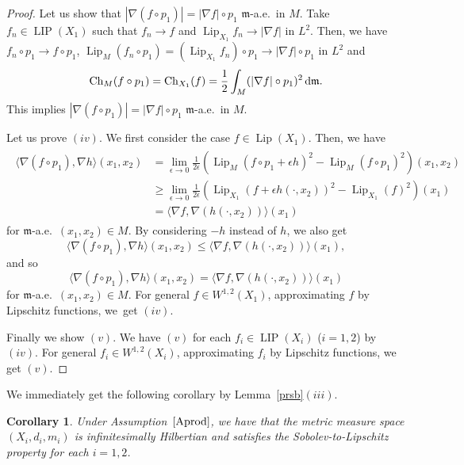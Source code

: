 \documentclass[pdftex]{sigma}
\numberwithin{equation}{section}
\newtheorem{Cor}[Thm]{Corollary}
\theoremstyle{definition}
\newcommand{\LIP}{\operatorname{LIP}}
\newcommand{\Lip}{\operatorname{Lip}}
\newcommand{\Ch}{\operatorname{Ch}}
\newcommand{\mf}{\mathfrak{m}}
\begin{document}
\begin{proof}
Let us show that $|\nabla (f\circ p_1)|=|\nabla f|\circ p_1$ $\mf$-a.e.\ in $M$.
Take $f_n\in \LIP(X_1)$ such that $f_n\to f$ and $\Lip_{X_1} f_n\to |\nabla f|$ in $L^2$.
Then, we have $f_n\circ p_1\to f\circ p_1$, $\Lip_M (f_n\circ p_1)=(\Lip_{X_1} f_n)\circ p_1 \to |\nabla f|\circ p_1$ in $L^2$ and
\[
\Ch_{M}(f\circ p_1)=\Ch_{X_1}(f)=\frac{1}{2}\int_{M}(|\nabla f|\circ p_1)^2\,{\rm d}\mf.
\]
This implies $|\nabla (f\circ p_1)|=|\nabla f|\circ p_1$ $\mf$-a.e.\ in $M$.

Let us prove $(iv)$.
We first consider the case $f\in \Lip(X_1)$.
Then, we have
\begin{gather*}
\begin{split}
\langle\nabla(f\circ p_1),\nabla h\rangle(x_1,x_2)
&=\lim_{\epsilon\to 0}\frac{1}{2\epsilon}\left(\Lip_M(f\circ p_1+\epsilon h)^2-\Lip_M(f\circ p_1)^2\right)(x_1,x_2)\\
&\geq \lim_{\epsilon\to 0}\frac{1}{2\epsilon}\left(\Lip_{X_1}(f+\epsilon h(\cdot,x_2))^2-\Lip_{X_1}(f)^2\right)(x_1)\\
&=\langle\nabla f,\nabla (h(\cdot,x_2))\rangle(x_1)
\end{split}
\end{gather*}
for $\mf$-a.e.\ $(x_1,x_2)\in M$.
By considering $-h$ instead of $h$, we also get \[\langle\nabla(f\circ p_1),\nabla h\rangle(x_1,x_2)\leq \langle\nabla f,\nabla (h(\cdot,x_2))\rangle(x_1),\] and so \[\langle\nabla(f\circ p_1),\nabla h\rangle(x_1,x_2)= \langle\nabla f,\nabla (h(\cdot,x_2))\rangle(x_1)\]
for $\mf$-a.e.\ $(x_1,x_2)\in M$.
For general $f\in W^{1,2}(X_1)$, approximating $f$ by Lipschitz functions, we~get $(iv)$.

Finally we show $(v)$.
We have $(v)$ for each $f_i\in\LIP(X_i)$ ($i=1,2$) by $(iv)$.
For general $f_i\in W^{1,2}(X_i)$, approximating $f_i$ by Lipschitz functions, we get $(v)$.
\end{proof}

We immediately get the following corollary by Lemma~\ref{prsb}$(iii)$.
\begin{Cor}\label{ihsl}
Under Assumption~$\ref{Aprod}$, we have that the metric measure space $(X_i,d_i,m_i)$ is infinitesimally Hilbertian and satisfies the Sobolev-to-Lipschitz property for each $i=1,2$.
\end{Cor}
\end{document}
